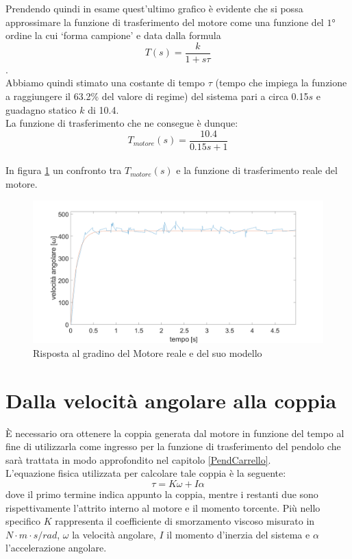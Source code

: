 Prendendo quindi in esame quest'ultimo grafico è evidente che si possa approssimare la funzione di trasferimento del motore come una funzione del $\ang{1}$ ordine la cui `forma campione' e data dalla formula $$T(s)=\displaystyle\frac{k}{1+s\tau}$$. \\
Abbiamo quindi stimato una costante di tempo $\tau$ (tempo che impiega la funzione a raggiungere il 63.2\% del valore di regime) del sistema pari a circa 0.15$s$ e guadagno statico $k$ di 10.4.\\
La funzione di trasferimento che ne consegue è dunque:
\\
$$
T_{motore}(s)=\displaystyle\frac{10.4}{0.15s+1}
$$
\\
In figura \ref{modMotorvsReale} un confronto tra $T_{motore}(s)$ e la funzione di trasferimento reale del motore.
\begin{figure}[ht]
	\centering
	\includegraphics[width=\textwidth]{modMotorvsReale.png}
	\caption{Risposta al gradino del Motore reale e del suo modello}
	\label{modMotorvsReale}
\end{figure}

\section{Dalla velocità angolare alla coppia}
È necessario ora ottenere la coppia generata dal motore in funzione del tempo al fine di utilizzarla come ingresso per la funzione di trasferimento del pendolo che sarà trattata in modo approfondito nel capitolo \ref{PendCarrello}.\\
L'equazione fisica utilizzata per calcolare tale coppia è la seguente:
$$
\tau=K\omega+I\alpha
$$
dove il primo termine indica appunto la coppia, mentre i restanti due sono rispettivamente l'attrito interno al motore e il momento torcente.
Più nello specifico $K$ rappresenta il coefficiente di smorzamento viscoso misurato in $N\cdot m\cdot s/rad$, $\omega$ la velocità angolare, $I$ il momento d'inerzia del sistema e $\alpha$ l'accelerazione angolare.

